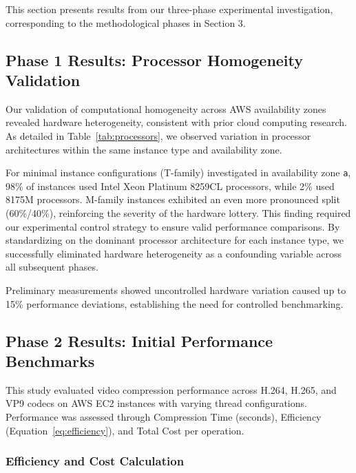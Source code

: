 \documentclass[conference]{IEEEtran}
\begin{document}
	This section presents results from our three-phase experimental investigation, corresponding to the methodological phases in Section 3.
	
	\subsection{Phase 1 Results: Processor Homogeneity Validation}
	\label{results-phase1}
	
	Our validation of computational homogeneity across AWS availability zones revealed hardware heterogeneity, consistent with prior cloud computing research. As detailed in Table~\ref{tab:processors}, we observed variation in processor architectures within the same instance type and availability zone.
	
	For minimal instance configurations (T-family) investigated in availability zone \texttt{a}, 98\% of instances used Intel Xeon Platinum 8259CL processors, while 2\% used 8175M processors. M-family instances exhibited an even more pronounced split (60\%/40\%), reinforcing the severity of the hardware lottery. This finding required our experimental control strategy to ensure valid performance comparisons. By standardizing on the dominant processor architecture for each instance type, we successfully eliminated hardware heterogeneity as a confounding variable across all subsequent phases.
	
	Preliminary measurements showed uncontrolled hardware variation caused up to 15\% performance deviations, establishing the need for controlled benchmarking.
	
	
	
	
	
	
	
	
	
	
	
	
	\subsection{Phase 2 Results: Initial Performance Benchmarks}
	\label{results-phase2}
	
	This study evaluated video compression performance across H.264, H.265, and VP9 codecs on AWS EC2 instances with varying thread configurations. Performance was assessed through Compression Time (seconds), Efficiency (Equation~\ref{eq:efficiency}), and Total Cost per operation.
	
	\subsubsection{Efficiency and Cost Calculation}
	\label{efficiency-calculation}
	
\end{document}
